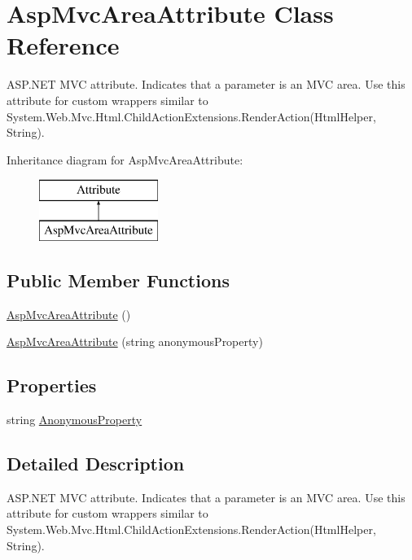 \hypertarget{class_asp_mvc_area_attribute}{}\section{Asp\+Mvc\+Area\+Attribute Class Reference}
\label{class_asp_mvc_area_attribute}


A\+S\+P.\+N\+E\+T M\+V\+C attribute. Indicates that a parameter is an M\+V\+C area. Use this attribute for custom wrappers similar to {\ttfamily System.\+Web.\+Mvc.\+Html.\+Child\+Action\+Extensions.\+Render\+Action(\+Html\+Helper, String)}.  


Inheritance diagram for Asp\+Mvc\+Area\+Attribute\+:\begin{figure}[H]
\begin{center}
\leavevmode
\includegraphics[height=2.000000cm]{class_asp_mvc_area_attribute}
\end{center}
\end{figure}
\subsection*{Public Member Functions}
\begin{DoxyCompactItemize}
\item 
\hyperlink{class_asp_mvc_area_attribute_ad0a2217f02a87a3076399063598635b0}{Asp\+Mvc\+Area\+Attribute} ()
\item 
\hyperlink{class_asp_mvc_area_attribute_ab0b90abe9b82844d54dd498623e0674e}{Asp\+Mvc\+Area\+Attribute} (string anonymous\+Property)
\end{DoxyCompactItemize}
\subsection*{Properties}
\begin{DoxyCompactItemize}
\item 
string \hyperlink{class_asp_mvc_area_attribute_a035e4e50658d154dfa22d68a08425a6b}{Anonymous\+Property}
\end{DoxyCompactItemize}


\subsection{Detailed Description}
A\+S\+P.\+N\+E\+T M\+V\+C attribute. Indicates that a parameter is an M\+V\+C area. Use this attribute for custom wrappers similar to {\ttfamily System.\+Web.\+Mvc.\+Html.\+Child\+Action\+Extensions.\+Render\+Action(\+Html\+Helper, String)}. 



